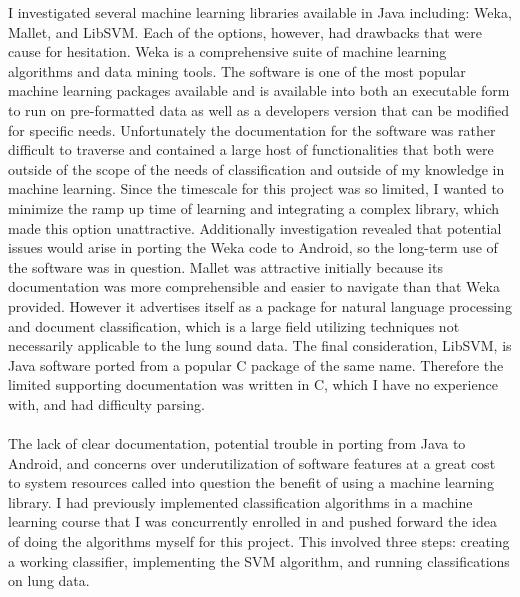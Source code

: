 \documentclass{article}
\begin{document}
 I investigated several machine learning libraries available in Java including: Weka, Mallet, and LibSVM. Each of the options, however, had drawbacks that were cause for hesitation. Weka is a comprehensive suite of machine learning algorithms and data mining tools. The software is one of the most popular machine learning packages available and is available into both an executable form to run on pre-formatted data as well as a developers version that can be modified for specific needs. Unfortunately the documentation for the software was rather difficult to traverse and contained a large host of functionalities that both were outside of the scope of the needs of classification and outside of my knowledge in machine learning. Since the timescale for this project was so limited, I wanted to minimize the ramp up time of learning and integrating a complex library, which made this option unattractive. Additionally investigation revealed that potential issues would arise in porting the Weka code to Android, so the long-term use of the software was in question. Mallet was attractive initially because its documentation was more comprehensible and easier to navigate than that Weka provided. However it advertises itself as a package for natural language processing and document classification, which is a large field utilizing techniques not necessarily applicable to the lung sound data. The final consideration, LibSVM, is Java software ported from a popular C package of the same name. Therefore the limited supporting documentation was written in C, which I have no experience with, and had difficulty parsing. \cite{Weka, Mallet} \\
 \\
 
 The lack of clear documentation, potential trouble in porting from Java to Android, and concerns over underutilization of software features at a great cost to system resources called into question the benefit of using a machine learning library. I had previously implemented classification algorithms in a machine learning course that I was concurrently enrolled in and pushed forward the idea of doing the algorithms myself for this project. This involved three steps: creating a working classifier, implementing the SVM algorithm, and running classifications on lung data.\\
 
\end{document}
